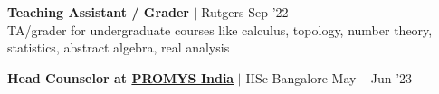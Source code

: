 \resumeProjectHeading
{\textbf{Teaching Assistant / Grader} $|$ Rutgers}
{Sep '22 -- }\\
\vspace{4pt}
{\color{gray}TA/grader for undergraduate courses like calculus, topology, number theory, statistics, abstract algebra, real analysis}
\vspace{-13pt}

\resumeProjectHeading
{\textbf{Head Counselor at \href{https://promys-india.org}{PROMYS India}} $|$ IISc Bangalore}
{May -- Jun '23}
\vspace{\mygap}

